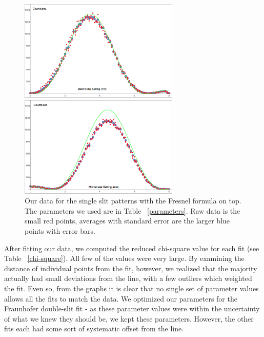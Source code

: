 \documentclass[prb,preprint]{revtex4-1}
\begin{document}
\begin{figure}[h!]
\centering
\begin{minipage}[b]{0.45\linewidth}
	\includegraphics[width=3in]{far_slit_Fresnel_plot.png}
\end{minipage}
\quad
\begin{minipage}[b]{0.45\linewidth}
	\includegraphics[width=3in]{near_slit_Fresnel_plot.png}
\end{minipage}
\caption{Our data for the single slit patterns with the Fresnel formula on top. The parameters we used are in Table ~\ref{parameters}. Raw data is the small red points, averages with standard error are the larger blue points with error bars. }
\label{single_slits_Fresnel_plot}
\end{figure} 

After fitting our data, we computed the reduced chi-square value for each fit (see Table ~\ref{chi-square}).  All few of the values were very large.  By examining the distance of individual points from the fit, however, we realized that the majority actually had small deviations from the line, with a few outliers which weighted the fit.  Even so, from the graphs it is clear that no single set of parameter values allows all the fits to match the data.  We optimized our parameters for the Fraunhofer double-slit fit - as these parameter values were within the uncertainty of what we knew they should be, we kept these parameters.  However, the other fits each had some sort of systematic offset from the line.  
\end{document}

